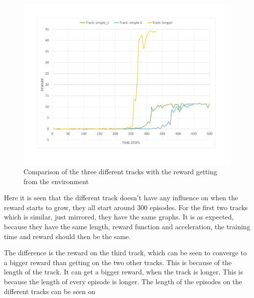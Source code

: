 \begin{figure}[H]
	\centering
	\includegraphics[width=1\textwidth]{Figures/Result/change_of_track_reward_graph.pdf}
	\caption{Comparison of the three different tracks with the reward getting from the environment}
	\label{fig:change_of_track_reward_graph}
\end{figure}

Here it is seen that the different track doesn't have any influence on when the reward starts to grow, they all start around 300 episodes. For the first two tracks which is similar, just mirrored, they have the same graphs. It is as expected, because they have the same length, reward function and acceleration, the training time and reward should then be the same. 

The difference is the reward on the third track, which can be seen to converge to a bigger reward than getting on the two other tracks. This is because of the length of the track. It can get a bigger reward, when the track is longer. This is because the length of every episode is longer. The length of the episodes on the different tracks can be seen on      

